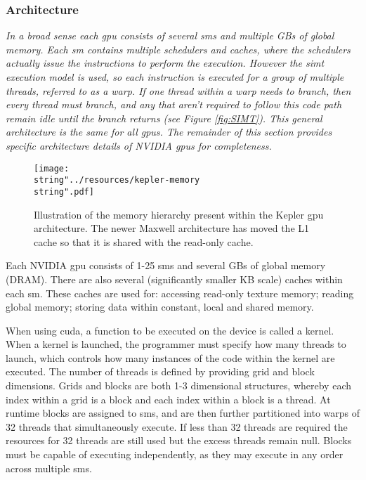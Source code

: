     \subsubsection{ Architecture\label{sub:NVIDIA-GPU-Architecture}}
      \emph{In a broad sense each \gls{gpu} consists of several \glspl{sm} and multiple GBs of global memory. Each \gls{sm} contains multiple schedulers and caches, where the schedulers actually issue the instructions to perform the execution. However the \gls{simt} execution model is used, so each instruction is executed for a group of multiple threads, referred to as a warp. If one thread within a warp needs to branch, then every thread must branch, and any that aren't required to follow this code path remain idle until the branch returns (see Figure \ref{fig:SIMT}). This general architecture is the same for all \glspl{gpu}. The remainder of this section  provides specific architecture details of NVIDIA \glspl{gpu} for completeness.}\\
      
    \begin{wrapfigure}{O}{0.5\columnwidth}%
    \begin{centering}
      \texttt{[image: \\string"../resources/kepler-memory\\string".pdf]}
    \par\end{centering}
    \protect\caption[Illustration of the memory hierarchy present within the Kepler \gls{gpu} architecture.]{\label{fig:kepler-memory}Illustration of the memory hierarchy present within the Kepler \gls{gpu} architecture. The newer Maxwell architecture has moved the L1 cache so that it is shared with the read-only cache.}
  \end{wrapfigure}%

      Each NVIDIA \gls{gpu} consists of 1-25 \glspl{sm} and several GBs of global memory (DRAM). There are also several (significantly smaller KB scale) caches within each \gls{sm}. These caches are used for: accessing read-only texture memory; reading global memory; storing data within constant, local and shared memory. 
      
      When using \gls{cuda}, a function to be executed on the device is called a kernel. When a kernel is launched, the programmer must specify how many threads to launch, which controls how many instances of the code within the kernel are executed. The number of threads is defined by providing grid and block dimensions. Grids and blocks are both 1-3 dimensional structures, whereby each index within a grid is a block and each index within a block is a thread. At runtime blocks are assigned to \glspl{sm}, and are then further partitioned into warps of 32 threads that simultaneously execute. If less than 32 threads are required the resources for 32 threads are still used but the excess threads remain null. Blocks must be capable of executing independently, as they may execute in any order across multiple \glspl{sm}.
      
